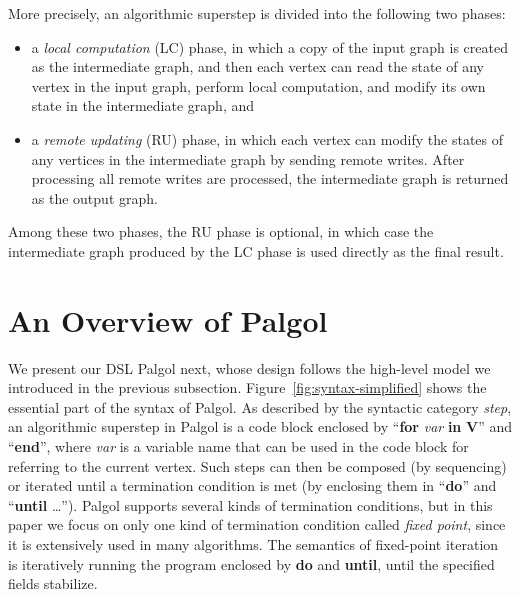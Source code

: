 \documentclass{sokendai_thesis} %
\begin{document}
More precisely, an algorithmic superstep is divided into the following two phases:
\begin{itemize}\setlength\itemsep{0em}
 \item a \emph{local computation} (LC) phase, in which a copy of the input graph is created as the intermediate graph, and then each vertex can read the state of any vertex in the input graph, perform local computation, and modify its own state in the intermediate graph, and
 \item a \emph{remote updating} (RU) phase, in which each vertex can modify the states of any vertices in the intermediate graph by sending remote writes.
After processing all remote writes are processed, the intermediate graph is returned as the output graph.
\end{itemize}
Among these two phases, the RU phase is optional, in which case the intermediate graph produced by the LC phase is used directly as the final result.

\section{An Overview of Palgol}
\label{sec:syntax}

We present our DSL Palgol next, whose design follows the high-level model we introduced in the previous subsection.
Figure~\ref{fig:syntax-simplified} shows the essential part of the syntax of Palgol.
As described by the syntactic category \textit{step}, an algorithmic superstep in Palgol is a code block
enclosed by ``\textbf{for} \textit{var} \textbf{in} \textbf{V}'' and ``\textbf{end}'', where \textit{var} is a variable name that can be used in the code block for referring to the current vertex.
Such steps can then be composed (by sequencing) or iterated until a termination condition is met (by enclosing them in ``\textbf{do}'' and ``\textbf{until} \ldots'').
Palgol supports several kinds of termination conditions, but in this paper we focus on only one kind of termination condition called \textit{fixed point}, since it is extensively used in many algorithms.
The semantics of fixed-point iteration is iteratively running the program enclosed by \textbf{do} and \textbf{until}, until the specified fields stabilize.
\end{document}
